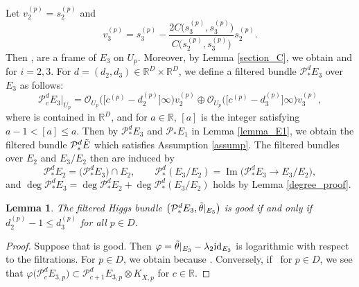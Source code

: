 \documentclass[10pt,a4paper]{amsart}
\numberwithin{equation}{section}
\newtheorem{Lemma}[Theorem]{Lemma}
\newcommand{\R}{\mathbb{R}}
\newcommand{\id}{\mathrm{id}}
\newcommand{\Image}{\operatorname{Im}}
\begin{document}
Let $v^{(p)}_2 = s^{(p)}_2$ and
\begin{equation*}
 v^{(p)}_3 = s^{(p)}_3-\frac{2C\bigl(s^{(p)}_3,s^{(p)}_3\bigr)}{C\bigl(s^{(p)}_2,s^{(p)}_3\bigr)}s^{(p)}_2.
\end{equation*}
Then ,  are a frame of $E_3$ on $U_p$. Moreover, by Lemma \ref{section_C}, we obtain  and  for $i=2,3$. For $d=(d_2,d_3)\in \R^D \times \R^D$, we define a filtered bundle $\mathcal{P}^d_{*}E_3$ over $E_3$ as follows:
\begin{equation*}%
 \mathcal{P}^d_{c}E_3|_{U_p} = \mathcal{O}_{U_p}\bigl(\bigl[c^{(p)}-d^{(p)}_2\bigr]\infty\bigr)v^{(p)}_2 \oplus \mathcal{O}_{U_p}\bigl(\bigl[c^{(p)}-d^{(p)}_3\bigr]\infty\bigr)v^{(p)}_3,
\end{equation*}
where  is contained in $\R^{D}$, and for $a\in\R$, $[a]$ is the integer satisfying $a-1<[a]\leq a$.
Then by $\mathcal{P}^d_{*}E_3$ and $\mathcal{P}_{*}E_1$ in Lemma \ref{lemma_E1}, we obtain the filtered bundle $\mathcal{P}_{*}^d \Tilde{E}$ which satisfies Assumption \ref{assump}.
The filtered bundles over $E_2$ and $E_3/E_2$ then are induced by
\begin{equation*}
 \mathcal{P}^{d}_{*}E_2 = \bigl(\mathcal{P}^{d}_{*}E_3\bigr) \cap E_2,\qquad \mathcal{P}^{d}_{*}(E_3/E_2) = \Image\bigl(\mathcal{P}^{d}_{*}E_3 \to E_3/E_2\bigr),
\end{equation*}
and $\deg{\mathcal{P}^{d}_*E_3} = \deg{\mathcal{P}^{d}_*E_2} + \deg{\mathcal{P}^{d}_*(E_3/E_2)}$ holds by Lemma \ref{degree_proof}.

\begin{Lemma}\label{good}
 The filtered Higgs bundle $\bigl(\mathcal{P}^d_*E_3,{\Tilde{\theta}}|_{E_3}\bigr)$ is good if and only if $d^{(p)}_2-1\leq d^{(p)}_3$ for all $p\in D$.
\end{Lemma}
\begin{proof}
 Suppose that  is good. Then $\varphi=\Tilde{\theta}|_{E_3}-\lambda_2\id_{E_3}$ is logarithmic with respect to the filtrations. For $p\in D$, we obtain  because . Conversely, if~ for $p\in D$, we see that $\varphi\bigl(\mathcal{P}^d_{c} E_{3,p}\bigr)\subset \mathcal{P}^d_{c+1} E_{3,p}\otimes K_{\overline{X},p}$ for $c\in\R$.
\end{proof}
\end{document}
